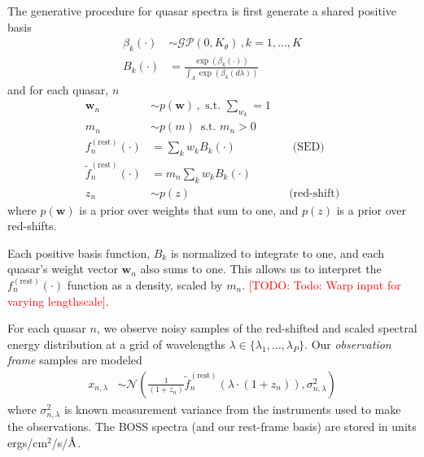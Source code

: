 \documentclass{article}
\newcommand{\angstrom}{\textup{\AA}}
\newcommand{\red}[1]{\textcolor{red}{[TODO: #1]}}
\begin{document}
The generative procedure for quasar spectra is first generate a shared positive basis
\begin{align}
  \beta_k(\cdot) &\sim \mathcal{GP}(0, K_\theta) \, , k=1, \dots, K\\
  B_k(\cdot) &= \frac{\exp(\beta_k(\cdot))}{\int_\Lambda \exp(\beta_k(d \lambda))}   
\end{align}
and for each quasar, $n$
\begin{align}
  \mathbf{w}_n &\sim p(\mathbf{w}) \, , \text{ s.t. } \sum_{w_k} = 1  \\
  m_n  &\sim p(m) \, \text{ s.t. } m_n > 0 \\
  f^{(\text{rest})}_n(\cdot) &= \sum_{k} w_k B_k(\cdot) &&\text{ (SED) }\\
  \tilde f^{(\text{rest})}_n(\cdot) &= m_n \sum_{k} w_k B_k(\cdot) \\
  z_n &\sim p(z) &&\text{(red-shift)}
\end{align}
where $p(\mathbf{w})$ is a prior over weights that sum to one, and $p(z)$ is a prior over red-shifts. 

Each positive basis function, $B_k$ is normalized to integrate to one, and each quasar's weight vector $\mathbf{w}_n$ also sums to one.  This allows us to interpret the $f^{(\text{rest})}_n(\cdot)$ function as a density, scaled by $m_n$. 
\red{Todo: Warp input for varying lengthscale}.  

For each quasar $n$, we observe noisy samples of the red-shifted and scaled spectral energy distribution at a grid of wavelengths $\lambda \in \{\lambda_1, \dots, \lambda_P \}$.  Our \emph{observation frame} samples are modeled
\begin{align}
  x_{n, \lambda} 
    &\sim \mathcal{N}\left( \frac{1}{(1 + z_n)} \tilde f_n^{(\text{rest})}( \lambda \cdot (1 + z_n) ), \sigma_{n,\lambda}^2 \right)
    \label{eq:spec} 
\end{align}
where $\sigma_{n, \lambda}^2$ is known measurement variance from the instruments
used to make the observations.
The BOSS spectra (and our rest-frame basis) are stored in units ergs/cm$^2$/s/$\angstrom$. 
\end{document}
